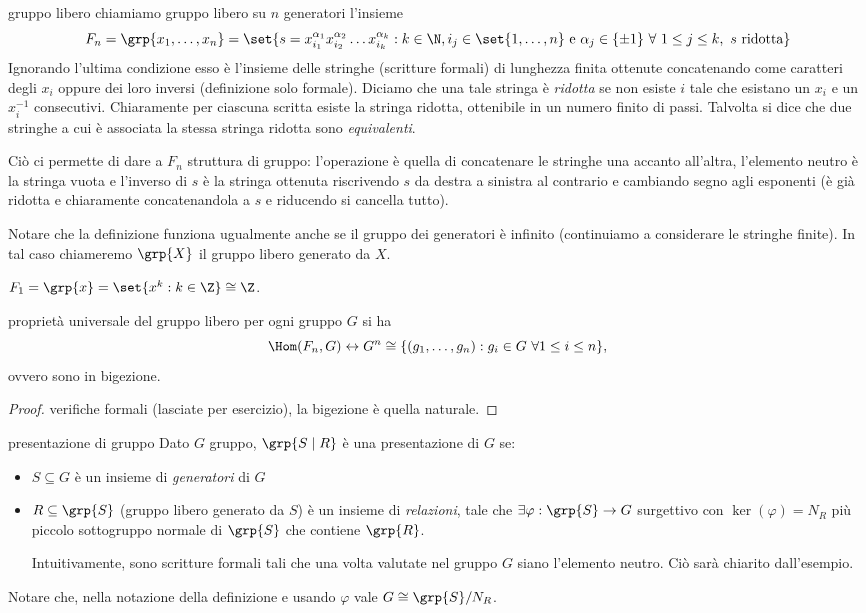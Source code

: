 \begin{definition}{gruppo libero}
    chiamiamo gruppo libero su $n$ generatori l'insieme
    \[ F_n = \grp{x_1, \dots, x_n} = \set{s = x_{i_1}^{\alpha_1} x_{i_2}^{\alpha_2} \dots x_{i_k}^{\alpha_k} : k \in \N, i_j \in \set{1,\dots,n} \text{ e } \alpha_j \in \{\pm 1\} \ \forall \  1 \leq j \leq k, \ s \text{ ridotta}} \]
    Ignorando l'ultima condizione esso è l'insieme delle stringhe (scritture formali) di lunghezza finita ottenute concatenando come caratteri degli $x_i$ oppure dei loro inversi (definizione solo formale). Diciamo che una tale stringa è \textit{ridotta} se non esiste $i$ tale che esistano un $x_i$ e un $x_i ^{-1}$ consecutivi. Chiaramente per ciascuna scritta esiste la stringa ridotta, ottenibile in un numero finito di passi. Talvolta si dice che due stringhe a cui è associata la stessa stringa ridotta sono \textit{equivalenti}.
    
    Ciò ci permette di dare a $F_n$ struttura di gruppo: l'operazione è quella di concatenare le stringhe una accanto all'altra, l'elemento neutro è la stringa vuota e l'inverso di $s$ è la stringa ottenuta riscrivendo $s$ da destra a sinistra al contrario e cambiando segno agli esponenti (è già ridotta e chiaramente concatenandola a $s$ e riducendo si cancella tutto).
    
    Notare che la definizione funziona ugualmente anche se il gruppo dei generatori è infinito (continuiamo a considerare le stringhe finite). In tal caso chiameremo $\grp{X}$ il gruppo libero generato da $X$. 
\end{definition}
\begin{example}
    $F_1 = \grp{x} = \set{x^k : k \in \Z} \cong \Z$.
\end{example}
\begin{proposition}{proprietà universale del gruppo libero}
    per ogni gruppo $G$ si ha \[\Hom(F_n, G) \leftrightarrow G^n \cong \{(g_1, \dots, g_n) : g_i \in G \ \forall 1 \leq i \leq n\}, \] ovvero sono in bigezione.
\end{proposition}
\begin{proof}
    verifiche formali (lasciate per esercizio), la bigezione è quella naturale. 
\end{proof}
\begin{definition}{presentazione di gruppo}
    Dato $G$ gruppo, $\grp{S \mid R}$ è una presentazione di $G$ se:
    \begin{itemize}
        \item $S\subseteq G$ è un insieme di \emph{generatori} di $G$
        \item $R \subseteq \grp{S}$ (gruppo libero generato da $S$) è un insieme di \emph{relazioni}, tale che $\exists \varphi: \grp{S} \rightarrow G$ surgettivo con $\ker(\varphi) = N_R$ più piccolo sottogruppo normale di $\grp{S}$ che contiene $\grp{R}$.

        Intuitivamente, sono scritture formali tali che una volta valutate nel gruppo $G$ siano l'elemento neutro. Ciò sarà chiarito dall'esempio.
    \end{itemize} 
    Notare che, nella notazione della definizione e usando $\varphi$ vale $G \cong \grp{S}/N_R$.
\end{definition}
